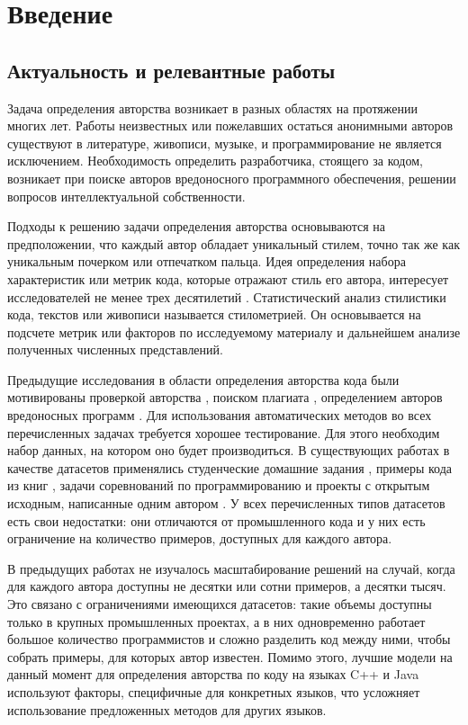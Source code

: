 \section*{Введение}\label{sec:introduction}

\subsection*{Актуальность и релевантные работы}
Задача определения авторства возникает в разных областях на протяжении многих лет. Работы неизвестных или пожелавших остаться анонимными авторов существуют в литературе, живописи, музыке, и программирование не является исключением. Необходимость определить разработчика, стоящего за кодом, возникает при поиске авторов вредоносного программного обеспечения, решении вопросов интеллектуальной собственности.

Подходы к решению задачи определения авторства основываются на предположении, что каждый автор обладает уникальный стилем, точно так же как уникальным почерком или отпечатком пальца. Идея определения набора характеристик или метрик кода, которые отражают стиль его автора, интересует исследователей не менее трех десятилетий \cite{Halstead1972,Oman1989}. Статистический анализ стилистики кода, текстов или живописи называется стилометрией. Он основывается на подсчете метрик или факторов по исследуемому материалу и дальнейшем анализе полученных численных представлений.

Предыдущие исследования в области определения авторства кода были мотивированы проверкой авторства \cite{Elenbogen2008,Kothari2007}, поиском плагиата \cite{Ottenstein1976,Liu2006}, определением авторов вредоносных программ \cite{Layton2010,Caliskan2015}. Для использования автоматических методов во всех перечисленных задачах требуется хорошее тестирование. Для этого необходим набор данных, на котором оно будет производиться. В существующих работах в качестве датасетов применялись студенческие домашние задания \cite{Frantzeskou2007,Elenbogen2008,Krsul1997}, примеры кода из книг \cite{Oman1989,Frantzeskou2006}, задачи соревнований по программированию \cite{Rosenblum2011,Caliskan2015,Alsulami2017,Simko2018} и проекты с открытым исходным, написанные одним автором \cite{Shevertalov2009,Kothari2007,Yang2017,Zhang2017}. У всех перечисленных типов датасетов есть свои недостатки: они отличаются от промышленного кода и у них есть ограничение на количество примеров, доступных для каждого автора.

В предыдущих работах не изучалось масштабирование решений на случай, когда для каждого автора доступны не десятки или сотни примеров, а десятки тысяч. Это связано с ограничениями имеющихся датасетов: такие объемы доступны только в крупных промышленных проектах, а в них одновременно работает большое количество программистов и сложно разделить код между ними, чтобы собрать примеры, для которых автор известен. Помимо этого, лучшие модели на данный момент для определения авторства по коду на языках C++ и Java используют факторы, специфичные для конкретных языков, что усложняет использование предложенных методов для других языков.

